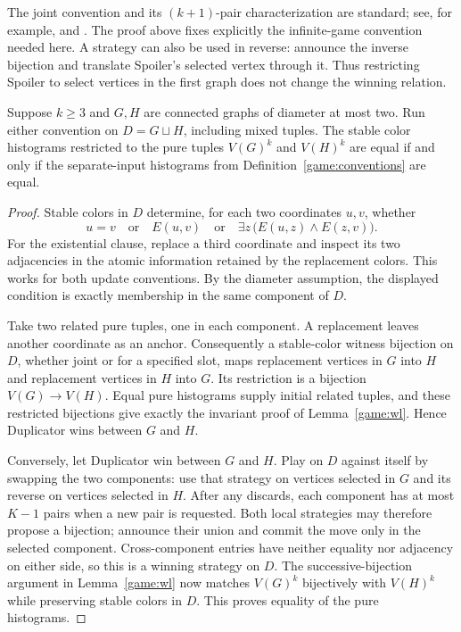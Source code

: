 The joint convention and its $(k+1)$-pair characterization are standard;
see, for example, \cite[Lemma~2]{CFICompression} and
\cite[arXiv v2, Lemma~7]{WLDimension}.  The proof above fixes explicitly the
infinite-game convention needed here.  A strategy can also be used in
reverse: announce the inverse bijection and translate Spoiler's selected
vertex through it.  Thus restricting Spoiler to select vertices in the
first graph does not change the winning relation.

\begin{lemma}
\label{game:union}
Suppose $k\geq3$ and $G,H$ are connected graphs of diameter at most two.
Run either convention on $D=G\sqcup H$, including mixed tuples.  The
stable color histograms restricted to the pure tuples $V(G)^k$ and
$V(H)^k$ are equal if and only if the separate-input histograms from
Definition~\ref{game:conventions} are equal.
\end{lemma}

\begin{proof}
Stable colors in $D$ determine, for each two coordinates $u,v$, whether
\[
 u=v\quad\text{or}\quad E(u,v)\quad\text{or}\quad
 \exists z\,\bigl(E(u,z)\wedge E(z,v)\bigr).
\]
For the existential clause, replace a third coordinate and inspect its
two adjacencies in the atomic information retained by the replacement
colors.  This works for both update conventions.  By the diameter
assumption, the displayed condition is exactly membership in the same
component of $D$.

Take two related pure tuples, one in each component.  A replacement
leaves another coordinate as an anchor.  Consequently a stable-color
witness bijection on $D$, whether joint or for a specified slot, maps
replacement vertices in $G$ into $H$ and replacement vertices in $H$
into $G$.  Its restriction is a bijection $V(G)\to V(H)$.  Equal pure
histograms supply initial related tuples, and these restricted
bijections give exactly the invariant proof of
Lemma~\ref{game:wl}.  Hence Duplicator wins between $G$ and $H$.

Conversely, let Duplicator win between $G$ and $H$.  Play on $D$ against
itself by swapping the two components: use that strategy on vertices
selected in $G$ and its reverse on vertices selected in $H$.  After
any discards, each component has at most $K-1$ pairs when a new pair is
requested.  Both local strategies may therefore propose a bijection;
announce their union and commit the move only in the selected
component.  Cross-component entries have neither equality nor
adjacency on either side, so this is a winning strategy on $D$.
The successive-bijection argument in Lemma~\ref{game:wl} now matches
$V(G)^k$ bijectively with $V(H)^k$ while preserving stable colors in
$D$.  This proves equality of the pure histograms.
\end{proof}

